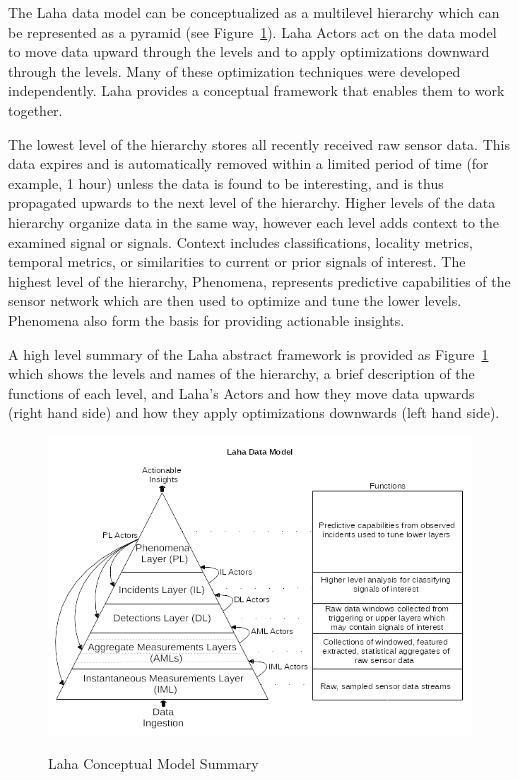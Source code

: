 The Laha data model can be conceptualized as a multilevel hierarchy which can be represented as a pyramid (see Figure~\ref{laha-abstract-overview}). Laha Actors act on the data model to move data upward through the levels and to apply optimizations downward through the levels. Many of these optimization techniques were developed independently. Laha provides a conceptual framework that enables them to work together.

The lowest level of the hierarchy stores all recently received raw sensor data. This data expires and is automatically removed within a limited period of time (for example, 1 hour) unless the data is found to be interesting, and is thus propagated upwards to the next level of the hierarchy.  Higher levels of the data hierarchy organize data in the same way, however each level adds context to the examined signal or signals. Context includes classifications, locality metrics, temporal metrics, or similarities to current or prior signals of interest. The highest level of the hierarchy, Phenomena, represents predictive capabilities of the sensor network which are then used to optimize and tune the lower levels. Phenomena also form the basis for providing actionable insights.

A high level summary of the Laha abstract framework is provided as Figure~\ref{laha-abstract-overview} which shows the levels and names of the hierarchy, a brief description of the functions of each level, and Laha's Actors and how they move data upwards (right hand side) and how they apply optimizations downwards (left hand side).

\begin{figure}
	\caption{Laha Conceptual Model Summary}
	\centering
	\includegraphics{figures/laha_abstract_overview.png}
	\label{laha-abstract-overview}
\end{figure}

